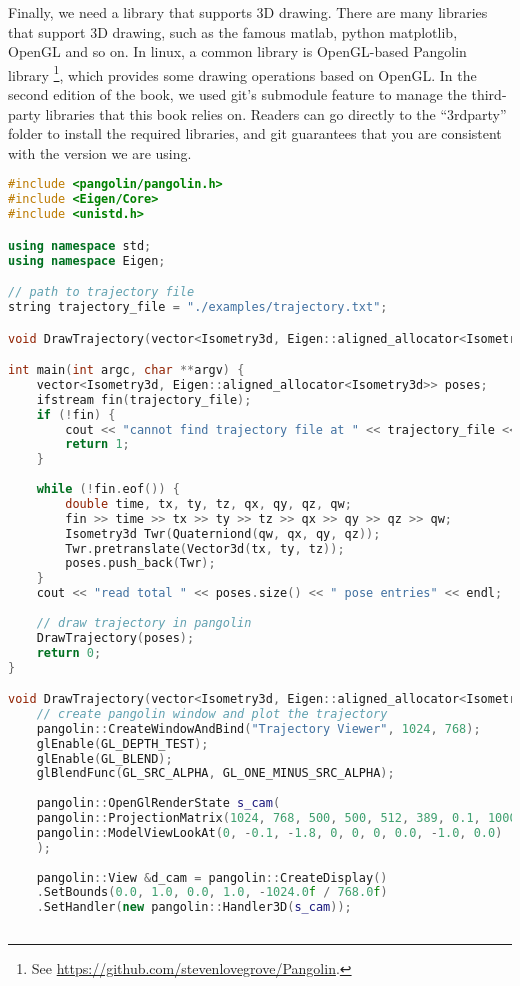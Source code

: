 Finally, we need a library that supports 3D drawing. There are many libraries that support 3D drawing, such as the famous matlab, python matplotlib, OpenGL and so on. In linux, a common library is OpenGL-based Pangolin library \footnote{See \url {https://github.com/stevenlovegrove/Pangolin}.}, which provides some drawing operations based on OpenGL. In the second edition of the book, we used git's submodule feature to manage the third-party libraries that this book relies on. Readers can go directly to the ``3rdparty'' folder to install the required libraries, and git guarantees that you are consistent with the version we are using.

\begin{lstlisting}[language=c++,caption=slambook2/ch3/examples/plotTrajectory.cpp]
#include <pangolin/pangolin.h>
#include <Eigen/Core>
#include <unistd.h>

using namespace std;
using namespace Eigen;

// path to trajectory file
string trajectory_file = "./examples/trajectory.txt";

void DrawTrajectory(vector<Isometry3d, Eigen::aligned_allocator<Isometry3d>>);

int main(int argc, char **argv) {
	vector<Isometry3d, Eigen::aligned_allocator<Isometry3d>> poses;
	ifstream fin(trajectory_file);
	if (!fin) {
		cout << "cannot find trajectory file at " << trajectory_file << endl;
		return 1;
	}
	
	while (!fin.eof()) {
		double time, tx, ty, tz, qx, qy, qz, qw;
		fin >> time >> tx >> ty >> tz >> qx >> qy >> qz >> qw;
		Isometry3d Twr(Quaterniond(qw, qx, qy, qz));
		Twr.pretranslate(Vector3d(tx, ty, tz));
		poses.push_back(Twr);
	}
	cout << "read total " << poses.size() << " pose entries" << endl;
	
	// draw trajectory in pangolin
	DrawTrajectory(poses);
	return 0;
}

void DrawTrajectory(vector<Isometry3d, Eigen::aligned_allocator<Isometry3d>> poses) {
	// create pangolin window and plot the trajectory
	pangolin::CreateWindowAndBind("Trajectory Viewer", 1024, 768);
	glEnable(GL_DEPTH_TEST);
	glEnable(GL_BLEND);
	glBlendFunc(GL_SRC_ALPHA, GL_ONE_MINUS_SRC_ALPHA);
	
	pangolin::OpenGlRenderState s_cam(
	pangolin::ProjectionMatrix(1024, 768, 500, 500, 512, 389, 0.1, 1000),
	pangolin::ModelViewLookAt(0, -0.1, -1.8, 0, 0, 0, 0.0, -1.0, 0.0)
	);
	
	pangolin::View &d_cam = pangolin::CreateDisplay()
	.SetBounds(0.0, 1.0, 0.0, 1.0, -1024.0f / 768.0f)
	.SetHandler(new pangolin::Handler3D(s_cam));
	

\end{lstlisting}
